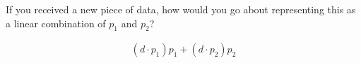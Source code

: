If you received a new piece of data, how would you go about representing this as a linear combination of $p_1$ and $p_2$?

\begin{solution}
    \begin{align*}
        (d \cdot p_1)p_1 + (d \cdot p_2)p_2
    \end{align*}
\end{solution}